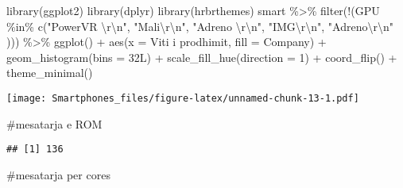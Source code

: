 \documentclass[
]{article}
\newenvironment{Shaded}{\begin{snugshade}}{\end{snugshade}}
\newcommand{\AttributeTok}[1]{\textcolor[rgb]{0.77,0.63,0.00}{#1}}
\newcommand{\DecValTok}[1]{\textcolor[rgb]{0.00,0.00,0.81}{#1}}
\newcommand{\FunctionTok}[1]{\textcolor[rgb]{0.00,0.00,0.00}{#1}}
\newcommand{\NormalTok}[1]{#1}
\newcommand{\SpecialCharTok}[1]{\textcolor[rgb]{0.00,0.00,0.00}{#1}}
\newcommand{\StringTok}[1]{\textcolor[rgb]{0.31,0.60,0.02}{#1}}
\begin{document}
\begin{Shaded}
\begin{Highlighting}[]
\FunctionTok{library}\NormalTok{(ggplot2)}
\FunctionTok{library}\NormalTok{(dplyr)}
\FunctionTok{library}\NormalTok{(hrbrthemes)}
\NormalTok{smart }\SpecialCharTok{\%\textgreater{}\%}
 \FunctionTok{filter}\NormalTok{(}\SpecialCharTok{!}\NormalTok{(GPU }\SpecialCharTok{\%in\%} \FunctionTok{c}\NormalTok{(}\StringTok{"PowerVR }\SpecialCharTok{\textbackslash{}r\textbackslash{}n}\StringTok{"}\NormalTok{, }\StringTok{"Mali}\SpecialCharTok{\textbackslash{}r\textbackslash{}n}\StringTok{"}\NormalTok{, }\StringTok{"Adreno }\SpecialCharTok{\textbackslash{}r\textbackslash{}n}\StringTok{"}\NormalTok{, }\StringTok{"IMG}\SpecialCharTok{\textbackslash{}r\textbackslash{}n}\StringTok{"}\NormalTok{, }\StringTok{"Adreno}\SpecialCharTok{\textbackslash{}r\textbackslash{}n}\StringTok{"}
\NormalTok{))) }\SpecialCharTok{\%\textgreater{}\%}
 \FunctionTok{ggplot}\NormalTok{() }\SpecialCharTok{+}
 \FunctionTok{aes}\NormalTok{(}\AttributeTok{x =} \StringTok{\textasciigrave{}}\AttributeTok{Viti i prodhimit}\StringTok{\textasciigrave{}}\NormalTok{, }\AttributeTok{fill =} \StringTok{\textasciigrave{}}\AttributeTok{Company}\StringTok{\textasciigrave{}}\NormalTok{) }\SpecialCharTok{+}
 \FunctionTok{geom\_histogram}\NormalTok{(}\AttributeTok{bins =}\NormalTok{ 32L) }\SpecialCharTok{+}
 \FunctionTok{scale\_fill\_hue}\NormalTok{(}\AttributeTok{direction =} \DecValTok{1}\NormalTok{) }\SpecialCharTok{+}
 \FunctionTok{coord\_flip}\NormalTok{() }\SpecialCharTok{+}
 \FunctionTok{theme\_minimal}\NormalTok{()}
\end{Highlighting}
\end{Shaded}

\texttt{[image: Smartphones\_files/figure-latex/unnamed-chunk-13-1.pdf]}

\#mesatarja e ROM

\begin{Shaded}
\end{Shaded}

\begin{verbatim}
## [1] 136
\end{verbatim}

\#mesatarja per cores

\begin{Shaded}
\end{Shaded}
\end{document}
